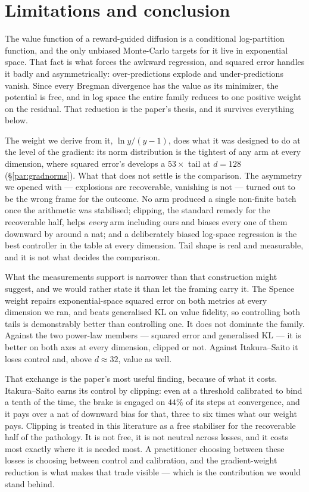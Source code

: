 \section{Limitations and conclusion}
\label{sec:09_conclusion}

The value function of a reward-guided diffusion is a conditional log-partition
function, and the only unbiased Monte-Carlo targets for it live in exponential
space. That fact is what forces the awkward regression, and squared error
handles it badly and asymmetrically: over-predictions explode and
under-predictions vanish. Since every Bregman divergence has the value as its
minimizer, the potential is free, and in log space the entire family reduces to
one positive weight on the residual. That reduction is the paper's thesis, and
it survives everything below.

The weight we derive from it, $\ln y/(y-1)$, does what it was designed to do at
the level of the gradient: its norm distribution is the tightest of any arm at
every dimension, where squared error's develops a $53\times$ tail at $d=128$
(\S\ref{par:gradnorms}). What that does not settle is the comparison.
The asymmetry we opened with --- explosions are recoverable, vanishing is not
--- turned out to be the wrong frame for the outcome. No arm produced a single
non-finite batch once the arithmetic was stabilised; clipping, the standard
remedy for the recoverable half, helps \emph{every} arm including ours and
biases every one of them downward by around a nat; and a deliberately biased
log-space regression is the best controller in the table at every dimension.
Tail shape is real and measurable, and it is not what decides the comparison.

What the measurements support is narrower than that construction might suggest,
and we would rather state it than let the framing carry it. The Spence weight
repairs exponential-space squared error on both metrics at every dimension we
ran, and beats generalised KL on value fidelity, so controlling both tails is
demonstrably better than controlling one. It does not dominate the family. Against the two
power-law members --- squared error and generalised KL --- it is better on both
axes at every dimension, clipped or not. Against Itakura--Saito it loses
control and, above $d\approx32$, value as well.

That exchange is the paper's most useful finding, because of what it costs.
Itakura--Saito earns its control by clipping: even at a threshold calibrated to
bind a tenth of the time, the brake is engaged on $44\%$ of its steps at
convergence, and it pays over a nat of downward bias for that, three to six
times what our weight pays. Clipping is treated in this literature as a free
stabiliser for the recoverable half of the pathology. It is not free, it is not
neutral across losses, and it costs most exactly where it is needed most. A
practitioner choosing between these losses is choosing between control and
calibration, and the gradient-weight reduction is what makes that trade visible
--- which is the contribution we would stand behind.

